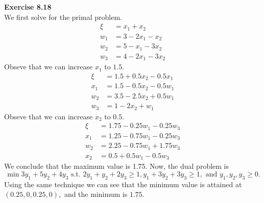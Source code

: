 \documentclass[letterpaper,12pt]{article}
\theoremstyle{definition}
\begin{document}
\noindent\textbf{Exercise 8.18}\\
We first solve for the primal problem.
\begin{align*}
  \xi &= x_1 + x_2 \\
  w_1 &= 3 - 2x_1 - x_2 \\
  w_2 &= 5 - x_1 - 3x_2 \\
  w_3 &= 4 - 2x_1 -3x_2
\end{align*}
Obseve that we can increase $x_1 $ to $1.5.$
\begin{align*}
  \xi &= 1.5 + 0.5 x_2 - 0.5x_1 \\
  x_1 &= 1.5 - 0.5 x_2 - 0.5w_1 \\
  w_2 &= 3.5 - 2.5 x_2 + 0.5w_1 \\
  w_3 &= 1 - 2x_2 + w_1
\end{align*}
Obseve that we can increase $x_2 $ to $0.5.$
\begin{align*}
  \xi &= 1.75 - 0.25w_1 - 0.25w_3 \\
  x_1 &= 1.25 - 0.75w_1 - 0.25w_3 \\
  w_2 &= 2.25 - 0.75w_1 + 1.75w_3 \\
  x_2 &= 0.5 + 0.5w_1 - 0.5w_3
\end{align*}
We conclude that the maximum value is 1.75.
Now, the dual problem is $$\min 3y_1 +5y_2 + 4y_3 \text{ s.t. } 2y_1 +y_2 +2y_3 \geq 1, y_1 + 3y_2 + 3y_3 \geq 1, \text{ and } y_1, y_2, y_3 \geq 0.$$
Using the same technique we can see that the minimum value is attained at $(0.25, 0, 0.25,0),$ and the minimum is $1.75.$
\end{document}
